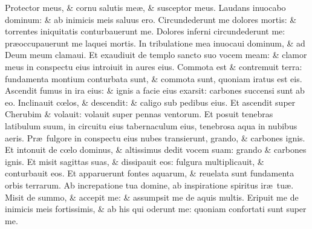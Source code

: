 \documentclass[a5paper,10pt]{book}
\def\ae{æ}
\def\oe{œ}
\begin{document}
\begin{multicols*}{2}
\newline \color{red} P\color{black}rotector meus, \& cornu salutis me\ae , \& susceptor meus.
\newline \color{red} L\color{black}audans inuocabo dominum: \& ab inimicis meis saluus ero.
\newline \color{red} C\color{black}ircundederunt me dolores mortis: \& torrentes iniquitatis conturbauerunt me.
\newline \color{red} D\color{black}olores inferni circundederunt me: pr\ae occupauerunt me laquei mortis.
\newline \color{red} I\color{black}n tribulatione mea inuocaui dominum, \& ad Deum meum clamaui.
\newline \color{red} E\color{black}t exaudiuit de templo sancto suo vocem meam: \& clamor meus in conspectu eius introiuit in aures eius.
\newline \color{red} C\color{black}ommota est \& contremuit terra: fundamenta montium conturbata sunt, \& commota sunt, quoniam iratus est eis.
\newline \color{red} A\color{black}scendit fumus in ira eius: \& ignis a facie eius exarsit: carbones succensi sunt ab eo.
\newline \color{red} I\color{black}nclinauit c\oe los, \& descendit: \& caligo sub pedibus eius.
\newline \color{red} E\color{black}t ascendit super Cherubim \& volauit: volauit super pennas ventorum.
\newline \color{red} E\color{black}t posuit tenebras latibulum suum, in circuitu eius tabernaculum eius, tenebrosa aqua in nubibus aeris.
\newline \color{red} P\color{black}r\ae \ fulgore in conspectu eius nubes transierunt, grando, \& carbones ignis.
\newline \color{red} E\color{black}t intonuit de c\oe lo dominus, \& altissimus dedit vocem suam: grando \& carbones ignis.
\newline \color{red} E\color{black}t misit sagittas suas, \& dissipauit eos: fulgura multiplicauit, \& conturbauit eos.
\newline \color{red} E\color{black}t apparuerunt fontes aquarum, \& reuelata sunt fundamenta orbis terrarum.
\newline \color{red} A\color{black}b increpatione tua domine, ab inspiratione spiritus ir\ae \ tu\ae .
\newline \color{red} M\color{black}isit de summo, \& accepit me: \& assumpsit me de aquis multis.
\newline \color{red} E\color{black}ripuit me de inimicis meis fortissimis, \& ab his qui oderunt me: quoniam confortati sunt super me.

\end{multicols*}
\end{document}
